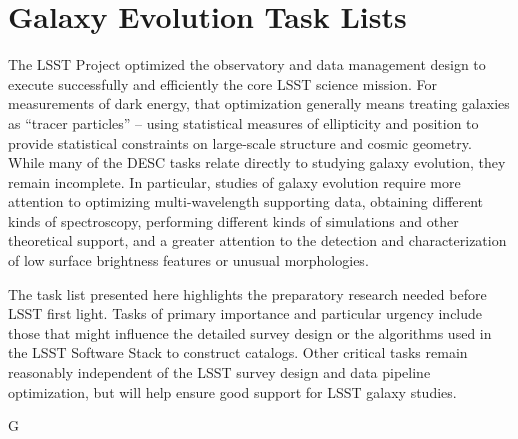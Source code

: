 
\section{Galaxy Evolution Task Lists}\label{sec:tasks:gal:intro}  
{\justify
The LSST Project optimized the observatory and data management design
to execute successfully and efficiently the core LSST science mission. 
For measurements
of dark energy, that optimization generally means treating galaxies as ``tracer particles'' --
 using statistical measures of ellipticity and position to provide statistical
constraints on large-scale structure and cosmic geometry. While many of the
DESC tasks relate directly to studying galaxy evolution, they remain 
incomplete. In particular, studies of galaxy evolution require more attention to 
optimizing multi-wavelength supporting data, obtaining different kinds of spectroscopy, 
performing different
kinds of simulations and other theoretical support, and a greater attention to 
the detection
and characterization of low surface brightness features or unusual morphologies.

The task list presented here highlights the preparatory research needed 
before LSST first light.
Tasks of primary importance and particular urgency include those that might influence the detailed survey
design or the algorithms used in the LSST Software Stack to construct catalogs. 
Other critical tasks remain reasonably independent of the
LSST survey design and data pipeline optimization, but will help ensure good support for
LSST galaxy studies.

\begin{tasklist}{G}


\end{tasklist}}
